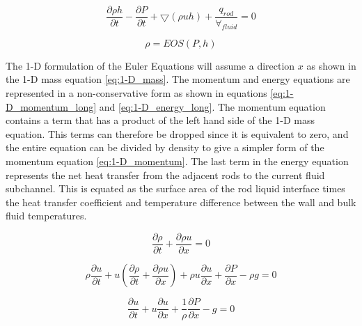    \begin{equation}
    	\label{eq:pde_energy}
    	\frac{ \partial \rho h}{\partial t} -
    	\frac{ \partial  P}{\partial t} + 
    	\bigtriangledown ( \rho  u h )%
    	+ \frac{q_{rod}}{\forall_{fluid}}
    	= 0
    \end{equation}
    
    \begin{equation}
    	\label{eq:pde_EOS}
    	\rho = EOS(P,h)
    \end{equation}
    
    The 1-D formulation of the Euler Equations will assume a direction $x$ as shown
    in the 1-D mass equation \eqref{eq:1-D_mass}. The momentum and energy equations
    are represented in a non-conservative form as shown in equations
    \eqref{eq:1-D_momentum_long} and \eqref{eq:1-D_energy_long}. The momentum
    equation contains a term that has a product of the left hand side of the 1-D
    mass equation. This terms can therefore be dropped since it is equivalent
    to zero, and the entire equation can be divided by density to give a simpler
    form of the momentum equation \eqref{eq:1-D_momentum}. The last term in the
    energy equation represents the net heat transfer from the adjacent rods to
    the current fluid subchannel. This is equated as the surface area of
    the rod liquid interface times the heat transfer coefficient and temperature
    difference between the wall and bulk fluid temperatures. 
    
    \begin{equation}
    	\label{eq:1-D_mass}
    	\dfrac{ \partial \rho }{ \partial t} +
    	\dfrac{ \partial \rho u}{\partial x} = 0
    \end{equation}
    
    \begin{equation}
    	\label{eq:1-D_momentum_long}
    	\rho \dfrac{ \partial u }{ \partial t } + 
    	u \left(  \dfrac{ \partial \rho }{ \partial t } +
    	          \dfrac{ \partial \rho u }{\partial x} \right) +
    	\rho u \dfrac{ \partial u}{ \partial x} + 
    	\dfrac{ \partial P}{ \partial x}   - \rho g
    	= 0
    \end{equation}
    
    \begin{equation}
    	\label{eq:1-D_momentum}
    	\dfrac{ \partial u }{ \partial t } + 
    	u \dfrac{ \partial u }{ \partial x } + 
    	\dfrac{1}{ \rho } \dfrac{ \partial P }{ \partial x } - g  
    	= 0
    \end{equation}
    
